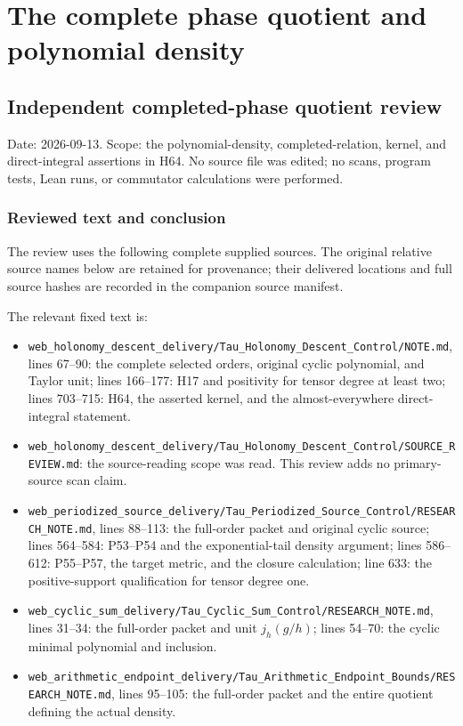 \begingroup

\section{The complete phase quotient and polynomial density}


\subsection{Independent completed-phase quotient review}\label{independent-completed-phase-quotient-review}

Date: 2026-09-13. Scope: the polynomial-density, completed-relation, kernel, and direct-integral assertions in H64. No source file was edited; no scans, program tests, Lean runs, or commutator calculations were performed.

\subsubsection{Reviewed text and conclusion}\label{reviewed-text-and-conclusion}

The review uses the following complete supplied sources. The original relative source names below are retained for provenance; their delivered locations and full source hashes are recorded in the companion source manifest.

The relevant fixed text is:

\begingroup\raggedright
\begin{itemize}
\tightlist
\item
  \nolinkurl{web_holonomy_descent_delivery/Tau_Holonomy_Descent_Control/NOTE.md}, lines 67--90: the complete selected orders, original cyclic polynomial, and Taylor unit; lines 166--177: H17 and positivity for tensor degree at least two; lines 703--715: H64, the asserted kernel, and the almost-everywhere direct-integral statement.
\item
  \nolinkurl{web_holonomy_descent_delivery/Tau_Holonomy_Descent_Control/SOURCE_REVIEW.md}: the source-reading scope was read. This review adds no primary-source scan claim.
\item
  \nolinkurl{web_periodized_source_delivery/Tau_Periodized_Source_Control/RESEARCH_NOTE.md}, lines 88--113: the full-order packet and original cyclic source; lines 564--584: P53--P54 and the exponential-tail density argument; lines 586--612: P55--P57, the target metric, and the closure calculation; line 633: the positive-support qualification for tensor degree one.
\item
  \nolinkurl{web_cyclic_sum_delivery/Tau_Cyclic_Sum_Control/RESEARCH_NOTE.md}, lines 31--34: the full-order packet and unit \(j_h(g/h)\); lines 54--70: the cyclic minimal polynomial and inclusion.
\item
  \nolinkurl{web_arithmetic_endpoint_delivery/Tau_Arithmetic_Endpoint_Bounds/RESEARCH_NOTE.md}, lines 95--105: the full-order packet and the entire quotient defining the actual density.
\end{itemize}
\endgroup

